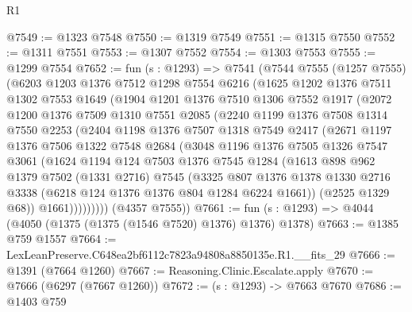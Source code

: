 \begin{lexlean}{R1}
\begin{coremodule}
@7549 := @1323 @7548
@7550 := @1319 @7549
@7551 := @1315 @7550
@7552 := @1311 @7551
@7553 := @1307 @7552
@7554 := @1303 @7553
@7555 := @1299 @7554
@7652 := fun (s : @1293) =>
  @7541
    (@7544
      @7555
      (@1257 @7555)
      (@6203
        @1203
        @1376
        @7512
        @1298
        @7554
        @6216
        (@1625
          @1202
          @1376
          @7511
          @1302
          @7553
          @1649
          (@1904
            @1201
            @1376
            @7510
            @1306
            @7552
            @1917
            (@2072
              @1200
              @1376
              @7509
              @1310
              @7551
              @2085
              (@2240
                @1199
                @1376
                @7508
                @1314
                @7550
                @2253
                (@2404
                  @1198
                  @1376
                  @7507
                  @1318
                  @7549
                  @2417
                  (@2671
                    @1197
                    @1376
                    @7506
                    @1322
                    @7548
                    @2684
                    (@3048
                      @1196
                      @1376
                      @7505
                      @1326
                      @7547
                      @3061
                      (@1624
                        @1194
                        @124
                        @7503
                        @1376
                        @7545
                        @1284
                        (@1613
                          @898
                          @962
                          @1379
                          @7502
                          (@1331 @2716)
                          @7545
                          (@3325
                            @807
                            @1376
                            @1378
                            @1330
                            @2716
                            @3338
                            (@6218 @124 @1376 @1376 @804 @1284 @6224 @1661))
                          (@2525 @1329 @68))
                        @1661)))))))))
      (@4357 @7555))
@7661 := fun (s : @1293) => @4044 (@4050 (@1375 (@1375 (@1546 @7520) @1376) @1376) @1378)
@7663 := @1385 @759 @1557
@7664 := LexLeanPreserve.C648ea2bf6112c7823a94808a8850135e.R1.__fits_29
@7666 := @1391 (@7664 @1260)
@7667 := Reasoning.Clinic.Escalate.apply
@7670 := @7666 (@6297 (@7667 @1260))
@7672 := (s : @1293) -> @7663 @7670
@7686 := @1403
    @759

\end{coremodule}
\end{lexlean}
